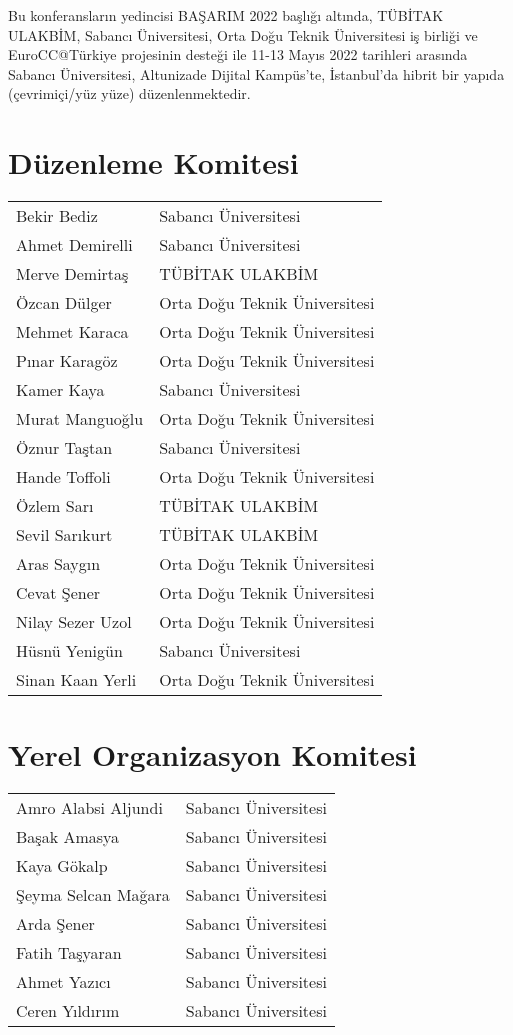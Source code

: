 Bu konferansların yedincisi BAŞARIM 2022 başlığı altında, TÜBİTAK ULAKBİM, Sabancı Üniversitesi, Orta Doğu Teknik Üniversitesi iş birliği
ve EuroCC@Türkiye projesinin desteği ile 11-13 Mayıs 2022 tarihleri arasında Sabancı Üniversitesi, Altunizade Dijital Kampüs'te, İstanbul'da hibrit bir yapıda (çevrimiçi/yüz yüze) düzenlenmektedir. 

\section{Düzenleme Komitesi}
\begin{tabular}{ll}
Bekir Bediz & Sabancı Üniversitesi \\
Ahmet Demirelli & Sabancı Üniversitesi \\
Merve Demirtaş & TÜBİTAK ULAKBİM \\
Özcan Dülger & Orta Doğu Teknik Üniversitesi \\
Mehmet Karaca & Orta Doğu Teknik Üniversitesi \\
Pınar Karagöz & Orta Doğu Teknik Üniversitesi \\
Kamer Kaya & Sabancı Üniversitesi \\
Murat Manguoğlu & Orta Doğu Teknik Üniversitesi \\
Öznur Taştan & Sabancı Üniversitesi \\
Hande Toffoli & Orta Doğu Teknik Üniversitesi \\
Özlem Sarı & TÜBİTAK ULAKBİM \\
Sevil Sarıkurt & TÜBİTAK ULAKBİM \\
Aras Saygın & Orta Doğu Teknik Üniversitesi \\
Cevat Şener & Orta Doğu Teknik Üniversitesi \\ 
Nilay Sezer Uzol & Orta Doğu Teknik Üniversitesi \\
Hüsnü Yenigün & Sabancı Üniversitesi \\
Sinan Kaan Yerli & Orta Doğu Teknik Üniversitesi \\
\end{tabular}

\section{Yerel Organizasyon Komitesi}
\begin{tabular}{ll}
Amro Alabsi Aljundi & Sabancı Üniversitesi \\
Başak Amasya & Sabancı Üniversitesi \\
Kaya Gökalp & Sabancı Üniversitesi \\
Şeyma Selcan Mağara & Sabancı Üniversitesi \\
Arda Şener & Sabancı Üniversitesi \\
Fatih Taşyaran & Sabancı Üniversitesi \\
Ahmet Yazıcı & Sabancı Üniversitesi \\
Ceren Yıldırım & Sabancı Üniversitesi
\end{tabular}

